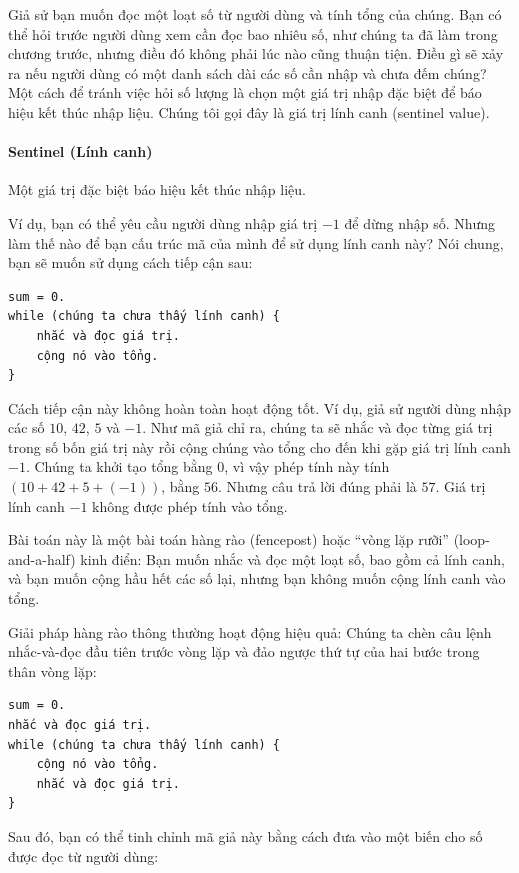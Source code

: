 Giả sử bạn muốn đọc một loạt số từ người dùng và tính tổng của chúng. Bạn có thể hỏi trước người dùng xem cần đọc bao nhiêu số, như chúng ta đã làm trong chương trước, nhưng điều đó không phải lúc nào cũng thuận tiện. Điều gì sẽ xảy ra nếu người dùng có một danh sách dài các số cần nhập và chưa đếm chúng? Một cách để tránh việc hỏi số lượng là chọn một giá trị nhập đặc biệt để báo hiệu kết thúc nhập liệu. Chúng tôi gọi đây là giá trị lính canh (sentinel value).

\paragraph{Sentinel (Lính canh)}
Một giá trị đặc biệt báo hiệu kết thúc nhập liệu.

Ví dụ, bạn có thể yêu cầu người dùng nhập giá trị $-1$ để dừng nhập số. Nhưng làm thế nào để bạn cấu trúc mã của mình để sử dụng lính canh này? Nói chung, bạn sẽ muốn sử dụng cách tiếp cận sau:

\begin{verbatim}
sum = 0.
while (chúng ta chưa thấy lính canh) {
    nhắc và đọc giá trị.
    cộng nó vào tổng.
}
\end{verbatim}


Cách tiếp cận này không hoàn toàn hoạt động tốt. Ví dụ, giả sử người dùng nhập các số $10$, $42$, $5$ và $-1$. Như mã giả chỉ ra, chúng ta sẽ nhắc và đọc từng giá trị trong số bốn giá trị này rồi cộng chúng vào tổng cho đến khi gặp giá trị lính canh $-1$. Chúng ta khởi tạo tổng bằng $0$, vì vậy phép tính này tính $(10 + 42 + 5 + (-1))$, bằng $56$. Nhưng câu trả lời đúng phải là $57$. Giá trị lính canh $-1$ không được phép tính vào tổng.

Bài toán này là một bài toán hàng rào (fencepost) hoặc ``vòng lặp rưỡi'' (loop-and-a-half) kinh điển: Bạn muốn nhắc và đọc một loạt số, bao gồm cả lính canh, và bạn muốn cộng hầu hết các số lại, nhưng bạn không muốn cộng lính canh vào tổng.

Giải pháp hàng rào thông thường hoạt động hiệu quả: Chúng ta chèn câu lệnh nhắc-và-đọc đầu tiên trước vòng lặp và đảo ngược thứ tự của hai bước trong thân vòng lặp:

\begin{verbatim}
sum = 0.
nhắc và đọc giá trị.
while (chúng ta chưa thấy lính canh) {
    cộng nó vào tổng.
    nhắc và đọc giá trị.
}
\end{verbatim}


Sau đó, bạn có thể tinh chỉnh mã giả này bằng cách đưa vào một biến cho số được đọc từ người dùng:

